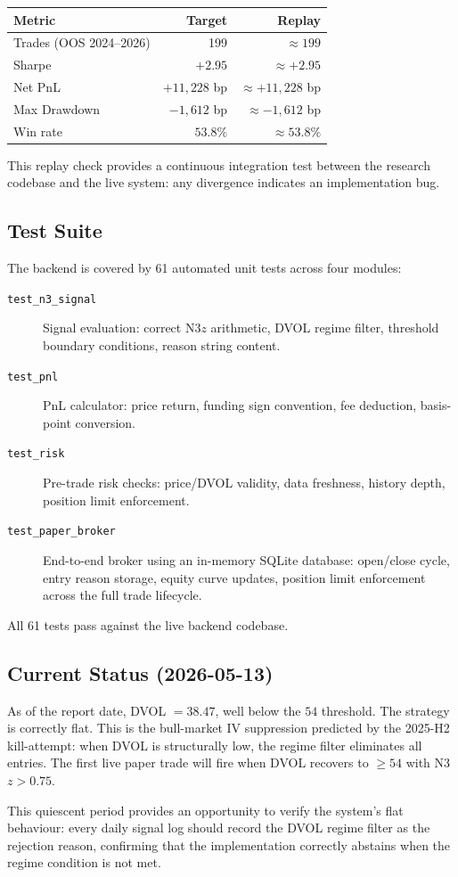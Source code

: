 \documentclass[12pt, a4paper]{article}
\theoremstyle{definition}
\begin{document}
\begin{center}
\begin{tabular}{lrr}
\hline
Metric & Target & Replay \\
\hline
Trades (OOS 2024--2026) & 199 & $\approx 199$ \\
Sharpe & $+2.95$ & $\approx +2.95$ \\
Net PnL & $+11{,}228$ bp & $\approx +11{,}228$ bp \\
Max Drawdown & $-1{,}612$ bp & $\approx -1{,}612$ bp \\
Win rate & $53.8\%$ & $\approx 53.8\%$ \\
\hline
\end{tabular}
\end{center}

This replay check provides a continuous integration test between the research
codebase and the live system: any divergence indicates an implementation bug.

\subsection{Test Suite}

The backend is covered by 61 automated unit tests across four modules:

\begin{description}
  \item[\texttt{test\_n3\_signal}] Signal evaluation: correct N3$z$ arithmetic,
    DVOL regime filter, threshold boundary conditions, reason string content.
  \item[\texttt{test\_pnl}] PnL calculator: price return, funding sign
    convention, fee deduction, basis-point conversion.
  \item[\texttt{test\_risk}] Pre-trade risk checks: price/DVOL validity, data
    freshness, history depth, position limit enforcement.
  \item[\texttt{test\_paper\_broker}] End-to-end broker using an in-memory
    SQLite database: open/close cycle, entry reason storage, equity curve
    updates, position limit enforcement across the full trade lifecycle.
\end{description}

All 61 tests pass against the live backend codebase.

\subsection{Current Status (2026-05-13)}

As of the report date, DVOL $= 38.47$, well below the $54$ threshold.  The
strategy is correctly flat.  This is the bull-market IV suppression predicted
by the 2025-H2 kill-attempt: when DVOL is structurally low, the regime filter
eliminates all entries.  The first live paper trade will fire when DVOL
recovers to $\geq 54$ with N3$z > 0.75$.

This quiescent period provides an opportunity to verify the system's flat
behaviour: every daily signal log should record the DVOL regime filter as the
rejection reason, confirming that the implementation correctly abstains when
the regime condition is not met.
\end{document}
